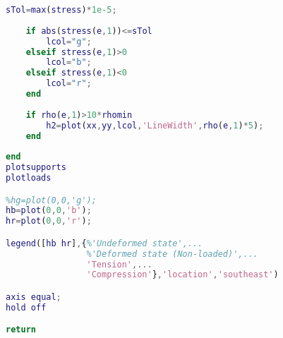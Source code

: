 \begin{lstlisting}[language=Matlab, caption = FE implementation for topology optimization, label=lst:CodeTopo]
    sTol=max(stress)*1e-5;
    
    if abs(stress(e,1))<=sTol
        lcol="g";
    elseif stress(e,1)>0
        lcol="b";
    elseif stress(e,1)<0
        lcol="r";
    end
    
    if rho(e,1)>10*rhomin
        h2=plot(xx,yy,lcol,'LineWidth',rho(e,1)*5);
    end
    
end
plotsupports
plotloads

%hg=plot(0,0,'g');
hb=plot(0,0,'b');
hr=plot(0,0,'r');

legend([hb hr],{%'Undeformed state',...
                %'Deformed state (Non-loaded)',...
                'Tension',...
                'Compression'},'location','southeast')

axis equal;
hold off

return

\end{lstlisting}